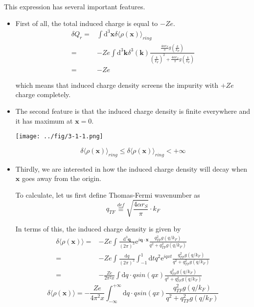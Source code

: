 This expression has several important features.
\begin{itemize}
\item First of all, the total induced charge is equal to $-Z e$.
\begin{equation} \label{Eqs3.1.25} \begin{split}
\delta Q_r =& \int \mathrm{d}^3 \mathbf{x} \delta \langle \rho(\mathbf{x}) \rangle_{ring}\\
=& -Z e \int \mathrm{d}^3 \mathbf{k} \delta^3(\mathbf{k})\frac{\frac{4\alpha r_S}{\pi}g\left( \frac{k}{k_F} \right)}{\left( \frac{k}{k_F} \right)^2+\frac{4\alpha r_S}{\pi}g\left( \frac{k}{k_F} \right)}\\
=& -Z e
\end{split}\end{equation}

which means that induced charge density screens the impurity with $+Z e$ charge completely.

\item The second feature is that the induced charge density is finite everywhere and it has maximum at $\mathbf{x}=0$.

\begin{center} \label{Fig3.1.1}
\texttt{[image: ../fig/3-1-1.png]}
\end{center}

\begin{equation}\label{Eqs3.1.26}
\delta \langle \rho(\mathbf{x}) \rangle_{ring} \leq \delta \langle \rho(\mathbf{x}) \rangle_{ring} < +\infty
\end{equation}

\item Thirdly, we are interested in how the induced charge density will decay when $\mathbf{x}$ goes away from the origin.

To calculate, let us first define Thomas-Fermi wavenumber as
\begin{equation} \label{Eqs3.1.27}
q_{TF} \overset{def}{\equiv} \sqrt{\frac{4\alpha r_S}{\pi}} \cdot k_F
\end{equation}

In terms of this, the induced charge density is given by
\[\begin{split} \delta \langle \rho(\mathbf{x}) \rangle =& -Z e \int \frac{\mathrm{d}^3 \mathbf{q}}{(2\pi)^3} \mathrm{e}^{i \mathbf{q}\cdot\mathbf{x}} \frac{q_{TF}^2 g(q/k_F)}{q^2 + q_{TF}^2 g(q/k_F)}\\
=& -Z e \int \frac{\mathrm{d} q}{(2\pi)^2} \int_{-1}^{1} \mathrm{d} t q^2 \mathrm{e}^{i q x t} \frac{q_{TF}^2 g(q/k_F)}{q^2 + q_{TF}^2 g(q/k_F)}\\
=&-\frac{Z e}{2\pi^2 x} \int \mathrm{d} q \cdot q sin (qx)\frac{q_{TF}^2 g(q/k_F)}{q^2 + q_{TF}^2 g(q/k_F)}
\end{split} \]
\begin{equation} \label{Eqs3.1.28}
\delta \langle \rho(\mathbf{x}) \rangle = -\frac{Z e}{4\pi^2 x} \int_{-\infty}^{+\infty} \mathrm{d} q \cdot q sin(qx) \frac{q_{TF}^2 g(q/k_F)}{q^2 + q_{TF}^2 g(q/k_F)}
\end{equation}


\end{itemize}

